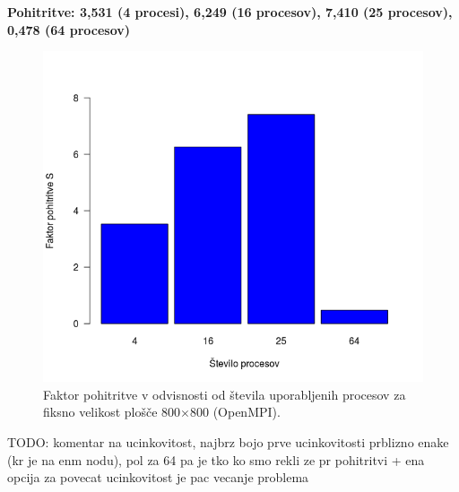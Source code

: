\documentclass[a4paper,titlepage,11pt]{article}
\begin{document}
\textbf{Pohitritve: 3,531 (4 procesi), 6,249 (16 procesov), 7,410 (25 procesov), 0,478 (64 procesov)}
\begin{figure}[H]
\begin{center}
\includegraphics[scale=0.6]{graf-rezultati-5_2.png}
\caption{Faktor pohitritve v odvisnosti od števila uporabljenih procesov za fiksno velikost plošče 800$\times$800 (OpenMPI).}
\label{graf-rezultati-pohitritev-5}
\end{center}
\vspace{-25pt}
\end{figure}

TODO: komentar na ucinkovitost, najbrz bojo prve ucinkovitosti prblizno enake (kr je na enm nodu), pol za 64 pa je tko ko smo rekli ze pr pohitritvi + ena opcija za povecat ucinkovitost je pac vecanje problema
\end{document}
